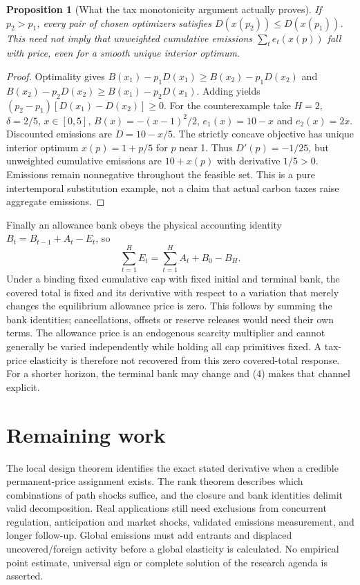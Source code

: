 \documentclass[11pt]{article}
\newtheorem{proposition}[theorem]{Proposition}
\begin{document}
\begin{proposition}[What the tax monotonicity argument actually proves]
If $p_2>p_1$, every pair of chosen optimizers satisfies
$D(x(p_2))\leq D(x(p_1))$. This need not imply that unweighted cumulative
emissions $\sum_te_t(x(p))$ fall with price, even for a smooth unique
interior optimum.
\end{proposition}
\begin{proof}
Optimality gives
$B(x_1)-p_1D(x_1)\geq B(x_2)-p_1D(x_2)$ and
$B(x_2)-p_2D(x_2)\geq B(x_1)-p_2D(x_1)$.
Adding yields $(p_2-p_1)[D(x_1)-D(x_2)]\geq0$.
For the counterexample take $H=2$, $\delta=2/5$, $x\in[0,5]$,
$B(x)=-(x-1)^2/2$, $e_1(x)=10-x$ and $e_2(x)=2x$.
Discounted emissions are $D=10-x/5$. The strictly concave objective has
unique interior optimum $x(p)=1+p/5$ for $p$ near 1.
Thus $D'(p)=-1/25$, but unweighted cumulative emissions are $10+x(p)$
with derivative $1/5>0$. Emissions remain nonnegative throughout the
feasible set. This is a pure intertemporal substitution example, not a
claim that actual carbon taxes raise aggregate emissions.
\end{proof}

Finally an allowance bank obeys the physical accounting identity
$B_t=B_{t-1}+A_t-E_t$, so
\[
 \sum_{t=1}^HE_t=\sum_{t=1}^HA_t+B_0-B_H.             \tag{4}
\]
Under a binding fixed cumulative cap with fixed initial and terminal bank,
the covered total is fixed and its derivative with respect to a variation
that merely changes the equilibrium allowance price is zero. This follows
by summing the bank identities; cancellations, offsets or reserve releases
would need their own terms. The allowance price is an endogenous scarcity
multiplier and cannot generally be varied independently while holding all
cap primitives fixed. A tax-price elasticity is therefore not recovered
from this zero covered-total response. For a shorter horizon, the terminal
bank may change and (4) makes that channel explicit.

\section{Remaining work}
The local design theorem identifies the exact stated derivative when a
credible permanent-price assignment exists. The rank theorem describes
which combinations of path shocks suffice, and the closure and bank
identities delimit valid decomposition. Real applications still need
exclusions from concurrent regulation, anticipation and market shocks,
validated emissions measurement, and longer follow-up. Global emissions
must add entrants and displaced uncovered/foreign activity before a global
elasticity is calculated. No empirical point estimate, universal sign or
complete solution of the research agenda is asserted.
\end{document}
